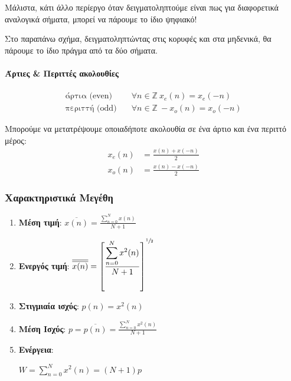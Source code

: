 \documentclass[11pt,a4paper,notitlepage,fleqn]{article}
\let\mytodo\todo
\renewcommand{\todo}[1]{\par\mytodo[inline,noline]{#1}}
\begin{document}
Μάλιστα, κάτι άλλο περίεργο όταν δειγματοληπτούμε είναι πως για διαφορετικά αναλογικά σήματα, μπορεί
να πάρουμε το ίδιο ψηφιακό!


Στο παραπάνω σχήμα, δειγματοληπτώντας στις κορυφές και στα μηδενικά, θα πάρουμε το ίδιο πράγμα από
τα δύο σήματα.

\paragraph{Άρτιες \& Περιττές ακολουθίες}
\begin{align*}
	\text{άρτια (even)} &\quad \forall n \in \mathbb Z \ x_e(n) = x_e(-n) \\
	\text{περιττή (odd)} &\quad \forall n \in \mathbb Z \ -x_o(n) = x_o(-n)
\end{align*}

Μπορούμε να μετατρέψουμε οποιαδήποτε ακολουθία σε ένα άρτιο και ένα περιττό μέρος:
\begin{align*}
	x_e(n) &= \frac{x(n) + x(-n)}{2}\\
	x_o(n) &= \frac{x(n) - x(-n)}{2}
\end{align*}

\subsubsection{Χαρακτηριστικά Μεγέθη}
\begin{enumerate}
	\item \textbf{Μέση τιμή}:
	\( \displaystyle
	\overline{x(n)} = \frac{\displaystyle \sum_{n=0}^{N} x(n)}{N+1}
	 \)
	\item \textbf{Ενεργός τιμή}:
	\( 
	\displaystyle
	\overline{\overline{x(n)}} = \left[
	\frac{\displaystyle \sum_{n=0}^{N} x^2(n)}{N+1}
	\right]^{\sfrac{1}{2} }
	 \)
	\item \textbf{Στιγμιαία ισχύς}:
	\( 
	\displaystyle
	p(n) = x^2(n)
	 \)
	\item \textbf{Μέση Ισχύς}:
	\( 
	\displaystyle
	p = \overline{p(n)} = \frac{\displaystyle \sum_{n=0}^{N} x^2(n)}{N+1}
	 \)
	\item \textbf{Ενέργεια}:	\todo{Check}
	\( 
	\displaystyle
	W = \sum_{n=0}^{N} x^2(n) = (N+1)p
	 \)
\end{enumerate}
\end{document}
